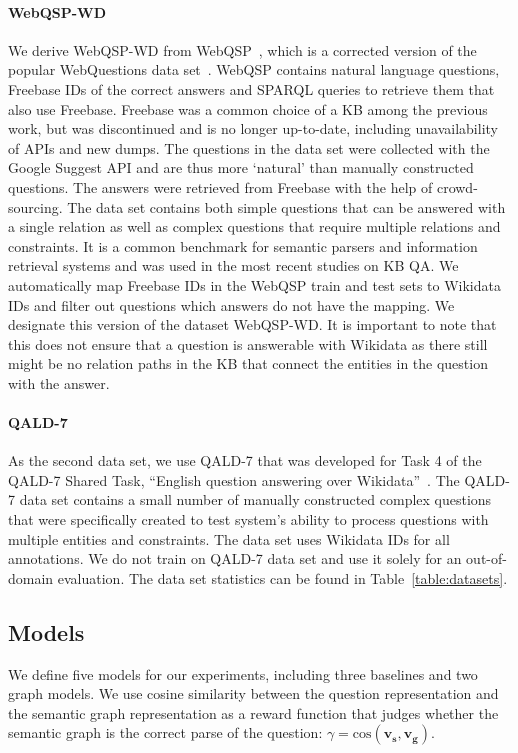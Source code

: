 \documentclass[11pt]{article}
\begin{document}
\paragraph{WebQSP-WD} We derive WebQSP-WD from WebQSP~\cite{Yih2016}, which is a corrected version of the popular WebQuestions data set~\cite{Berant2013}. WebQSP contains natural language questions, Freebase IDs of the correct answers and SPARQL queries to retrieve them that also use Freebase. Freebase was a common choice of a KB among the previous work, but was discontinued and is no longer up-to-date, including unavailability of APIs and new dumps. 
The questions in the data set were collected with the Google Suggest API and are thus more `natural' than manually constructed questions. The answers were retrieved from Freebase with the help of crowd-sourcing. The data set contains both simple questions that can be answered with a single relation as well as complex questions that require multiple relations and constraints. It is a common benchmark for semantic parsers and information retrieval systems and was used in the most recent studies on KB QA.
We automatically map Freebase IDs in the WebQSP train and test sets to Wikidata IDs and filter out questions which answers do not have the mapping.  We designate this version of the dataset WebQSP-WD. It is important to note that this does not ensure that a question is answerable with Wikidata as there still might be no relation paths in the KB that connect the entities in the question with the answer.

\paragraph{QALD-7}  As the second data set, we use QALD-7 that was developed for Task 4 of the QALD-7 Shared Task, ``English question answering over Wikidata''~\cite{10.1007/978-3-319-69146-6_6}. The QALD-7 data set contains a small number of manually constructed complex questions that were specifically created to test system's ability to process questions with multiple entities and constraints. The data set uses Wikidata IDs for all annotations. We do not train on QALD-7 data set and use it solely for an out-of-domain evaluation. The data set statistics can be found in Table~\ref{table:datasets}.

\subsection{Models}

We define five models for our experiments, including three baselines and two graph models. We use cosine similarity between the question representation and the semantic graph representation as a reward function that judges whether the semantic graph is the correct parse of the question: $\gamma = \mathrm{cos}(\mathbf{v_s}, \mathbf{v_g})$.
\end{document}
